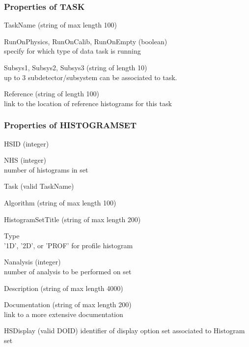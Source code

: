 \documentclass{lhcbnote}
\begin{document}
\subsubsection{Properties of TASK}
\begin{description}
\item{TaskName} (string of max length 100) 
\item{RunOnPhysics, RunOnCalib, RunOnEmpty} (boolean)\\
specify for which type of data task is running 
\item{Subsys1, Subsys2, Subsys3} (string of length 10)\\
up to 3 subdetector/subsystem can be associated to task. 
\item{Reference}  (string of length 100)\\
link to the location of reference histograms for this task
\end{description}

\subsubsection{Properties of HISTOGRAMSET}
\begin{description}
\item{HSID} (integer)
\item{NHS} (integer)\\
number of histograms in set
\item{Task} (valid TaskName) 
\item{Algorithm} (string of max length 100) 
\item{HistogramSetTitle} (string of max length 200) 
\item{Type} \\
'1D', '2D', or 'PROF' for profile histogram
\item{Nanalysis} (integer)\\
number of analysis to be performed on set
\item{Description} (string of max length 4000) 
\item{Documentation} (string of max length 200)\\
link to a more extensive documentation
\item{HSDisplay} (valid DOID)
identifier of display option set associated to Histogram set 
\end{description}
\end{document}
